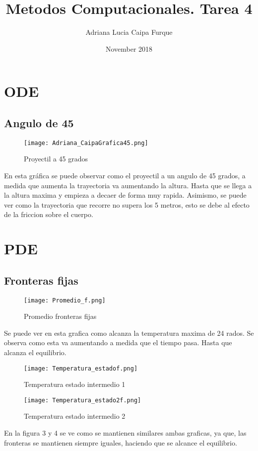 \documentclass{article}
\title{Metodos Computacionales. Tarea 4}
\author{Adriana Lucia Caipa Furque}
\date{November 2018}
\begin{document}
\maketitle
\section{ODE}
\subsection{Angulo de 45}
\begin{figure}[H] 
\centering
\texttt{[image: Adriana\_CaipaGrafica45.png]}
\caption{\label{fig:data}Proyectil a 45 grados}
\end{figure}
En esta gráfica se puede observar como el proyectil a un angulo de 45 grados, a medida que aumenta la trayectoria va aumentando la altura. Hasta que se llega a la altura maxima y empieza a decaer de forma muy rapida. Asimismo, se puede ver como la trayectoria que recorre no supera los 5 metros, esto se debe al efecto de la friccion sobre el cuerpo. 
\section{PDE}
\subsection{Fronteras fijas}

\begin{figure}[H] 
\centering
\texttt{[image: Promedio\_f.png]}
\caption{\label{fig:data}Promedio fronteras fijas}
\end{figure}
Se puede ver en esta grafica como alcanza la temperatura maxima de 24 rados. Se observa como esta va aumentando a medida que el tiempo pasa. Hasta que alcanza el equilibrio.
\begin{figure}[H] 
\centering
\texttt{[image: Temperatura\_estadof.png]}
\caption{\label{fig:data}Temperatura estado intermedio 1}
\end{figure}

\begin{figure}[H] 
\centering
\texttt{[image: Temperatura\_estado2f.png]}
\caption{\label{fig:data}Temperatura estado intermedio 2 }
\end{figure}
En la figura 3 y 4 se ve como se mantienen similares ambas graficas, ya que, las fronteras se mantienen siempre iguales, haciendo que se alcance el equilibrio.
\end{document}
